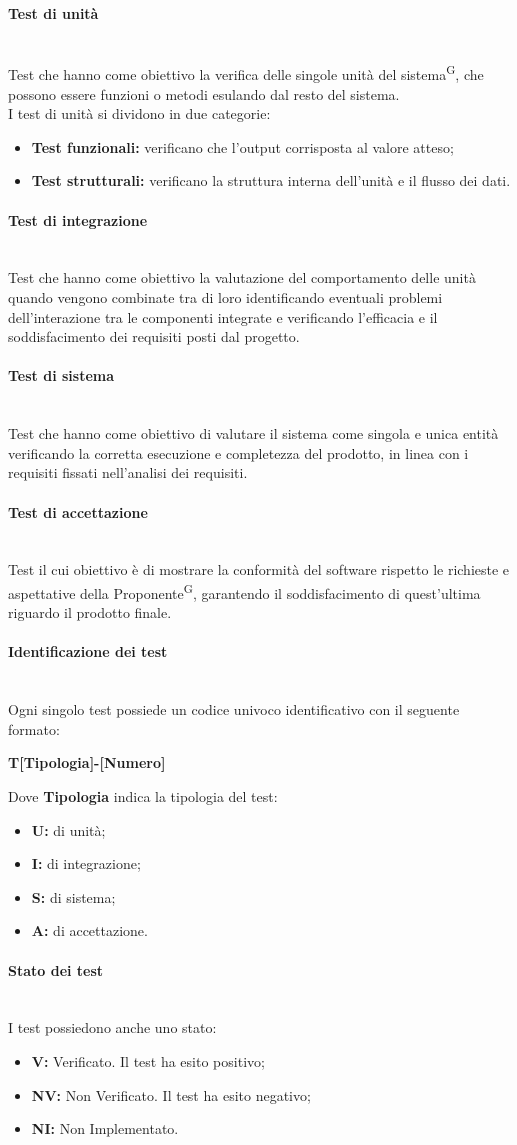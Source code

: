 \documentclass[8pt]{article}
\newcommand{\glossterm}[1]{#1\textsuperscript{G}} %
\newcommand{\subsubsubsection}[1]{\paragraph{#1}\mbox{}\\}
\begin{document}
\subsubsubsection{Test di unità}
Test che hanno come obiettivo la verifica delle singole unità del \glossterm{sistema}, che possono essere funzioni o metodi esulando dal resto del sistema. \\
I test di unità si dividono in due categorie:
\begin{itemize}
    \item \textbf{Test funzionali:} verificano che l'output corrisposta al valore atteso;
    \item \textbf{Test strutturali:} verificano la struttura interna dell'unità e il flusso dei dati.
\end{itemize}

\subsubsubsection{Test di integrazione}
Test che hanno come obiettivo la valutazione del comportamento delle unità quando vengono combinate tra di loro identificando eventuali problemi dell'interazione tra le componenti integrate e verificando l'efficacia e il soddisfacimento dei requisiti posti dal progetto.

\subsubsubsection{Test di sistema}
Test che hanno come obiettivo di valutare il sistema come singola e unica entità verificando la corretta esecuzione e completezza del prodotto, in linea con i requisiti fissati nell'analisi dei requisiti.

\subsubsubsection{Test di accettazione}
Test il cui obiettivo è di mostrare la conformità del software rispetto le richieste e aspettative della \glossterm{Proponente}, garantendo il soddisfacimento di quest'ultima riguardo il prodotto finale.

\subsubsubsection{Identificazione dei test}
Ogni singolo test possiede un codice univoco identificativo con il seguente formato:
\begin{center}
	\textbf{T[Tipologia]-[Numero]}
\end{center}
Dove \textbf{Tipologia} indica la tipologia del test: 
\begin{itemize}
    \item \textbf{U:} di unità;
	\item \textbf{I:} di integrazione;
	\item \textbf{S:} di sistema;
	\item \textbf{A:} di accettazione.
\end{itemize}

\subsubsubsection{Stato dei test}
I test possiedono anche uno stato:
\begin{itemize}
	\item \textbf{V:} Verificato. Il test ha esito positivo;
	\item \textbf{NV:} Non Verificato. Il test ha esito negativo; 
	\item \textbf{NI:} Non Implementato.
\end{itemize}
\end{document}
